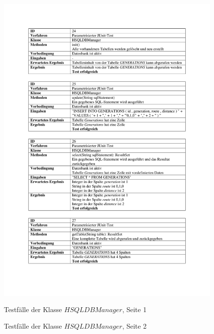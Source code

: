 \begin{appendices}
	\begin{figure}[h]
		\centering
		\caption{Testfälle der Klasse $HSQLDBManager$, Seite 1}
		\includegraphics[width=\linewidth]{images/Testfaelle_HSQLDB_Seite_1.pdf}
		\label{testHSQLDB1}
	\end{figure}
	\begin{figure}[h]
		\centering
		\caption{Testfälle der Klasse $HSQLDBManager$, Seite 2}

\end{figure}
\end{appendices}
